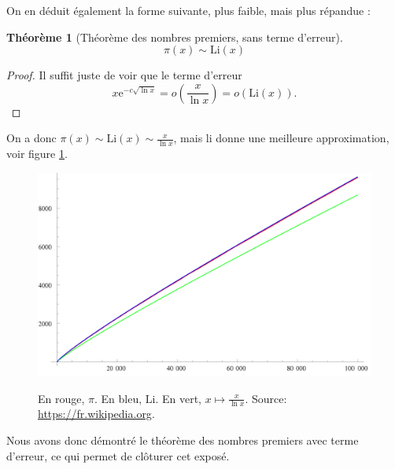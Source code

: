 \documentclass[french]{report}
\newtheorem{theorem}{Théorème}[section]
\begin{document}
On en déduit également la forme suivante, plus faible, mais plus répandue :

\begin{theorem}[Théorème des nombres premiers, sans terme d'erreur]\label{eq:tnp-equivalence}
  \[ \pi(x)\sim\mathrm{Li}(x) \]
\end{theorem}

\begin{proof}
  Il suffit juste de voir que le terme d'erreur
  \[
    x\mathrm{e}^{-c\sqrt{\ln x}}
    = o\left(\frac{x}{\ln x}\right)
    = o(\mathrm{Li}(x)).
  \]
\end{proof}

On a donc $\pi(x)\sim\mathrm{Li}(x)\sim\frac{x}{\ln x}$, mais $\mathrm{li}$ donne une meilleure approximation, voir figure \ref{fig:pi_li_xlnx}.
\\

\begin{figure}[h]
  \centering
  \caption{En rouge, $\pi$. En bleu, $\mathrm{Li}$. En vert, $x\mapsto\frac{x}{\ln x}$. Source: \url{https://fr.wikipedia.org}.}
  \includegraphics[width=\textwidth]{fig_pi_li_xlnx.png}
  \label{fig:pi_li_xlnx}
\end{figure}

Nous avons donc démontré le théorème des nombres premiers avec terme d'erreur, ce qui permet de clôturer cet exposé.

\end{document}
